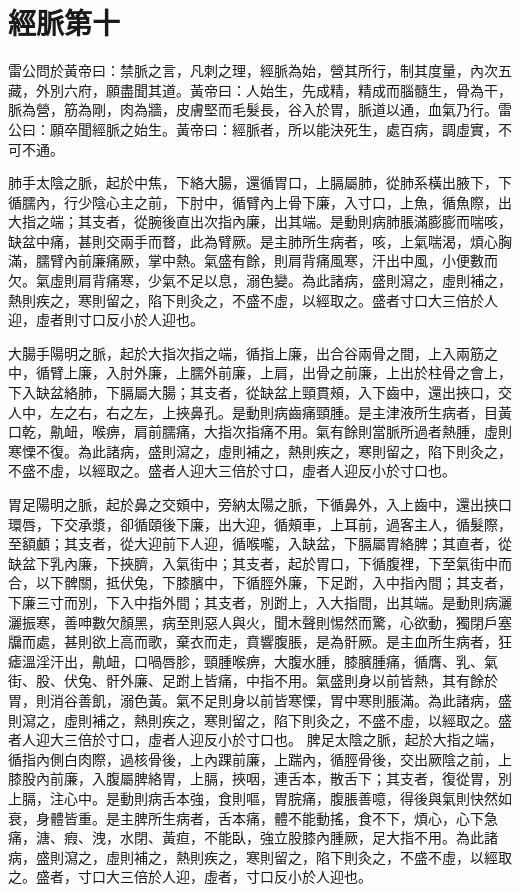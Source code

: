 \section{經脈第十}
雷公問於黃帝曰：禁脈之言，凡刺之理，經脈為始，營其所行，制其度量，內次五藏，外別六府，願盡聞其道。黃帝曰：人始生，先成精，精成而腦髓生，骨為干，脈為營，筋為剛，肉為牆，皮膚堅而毛髮長，谷入於胃，脈道以通，血氣乃行。雷公曰：願卒聞經脈之始生。黃帝曰：經脈者，所以能決死生，處百病，調虛實，不可不通。

肺手太陰之脈，起於中焦，下絡大腸，還循胃口，上膈屬肺，從肺系橫出腋下，下循臑內，行少陰心主之前，下肘中，循臂內上骨下廉，入寸口，上魚，循魚際，出大指之端；其支者，從腕後直出次指內廉，出其端。是動則病肺脹滿膨膨而喘咳，缺盆中痛，甚則交兩手而瞀，此為臂厥。是主肺所生病者，咳，上氣喘渴，煩心胸滿，臑臂內前廉痛厥，掌中熱。氣盛有餘，則肩背痛風寒，汗出中風，小便數而欠。氣虛則肩背痛寒，少氣不足以息，溺色變。為此諸病，盛則瀉之，虛則補之，熱則疾之，寒則留之，陷下則灸之，不盛不虛，以經取之。盛者寸口大三倍於人迎，虛者則寸口反小於人迎也。

大腸手陽明之脈，起於大指次指之端，循指上廉，出合谷兩骨之間，上入兩筋之中，循臂上廉，入肘外廉，上臑外前廉，上肩，出骨之前廉，上出於柱骨之會上，下入缺盆絡肺，下膈屬大腸；其支者，從缺盆上頸貫頰，入下齒中，還出挾口，交人中，左之右，右之左，上挾鼻孔。是動則病齒痛頸腫。是主津液所生病者，目黃口乾，鼽衄，喉痹，肩前臑痛，大指次指痛不用。氣有餘則當脈所過者熱腫，虛則寒慄不復。為此諸病，盛則瀉之，虛則補之，熱則疾之，寒則留之，陷下則灸之，不盛不虛，以經取之。盛者人迎大三倍於寸口，虛者人迎反小於寸口也。

胃足陽明之脈，起於鼻之交頞中，旁納太陽之脈，下循鼻外，入上齒中，還出挾口環唇，下交承漿，卻循頤後下廉，出大迎，循頰車，上耳前，過客主人，循髮際，至額顱；其支者，從大迎前下人迎，循喉嚨，入缺盆，下膈屬胃絡脾；其直者，從缺盆下乳內廉，下挾臍，入氣街中；其支者，起於胃口，下循腹裡，下至氣街中而合，以下髀關，抵伏兔，下膝臏中，下循脛外廉，下足跗，入中指內間；其支者，下廉三寸而別，下入中指外間；其支者，別跗上，入大指間，出其端。是動則病灑灑振寒，善呻數欠顏黑，病至則惡人與火，聞木聲則惕然而驚，心欲動，獨閉戶塞牖而處，甚則欲上高而歌，棄衣而走，賁響腹脹，是為骭厥。是主血所生病者，狂瘧溫淫汗出，鼽衄，口喎唇胗，頸腫喉痹，大腹水腫，膝臏腫痛，循膺、乳、氣街、股、伏兔、骭外廉、足跗上皆痛，中指不用。氣盛則身以前皆熱，其有餘於胃，則消谷善飢，溺色黃。氣不足則身以前皆寒慄，胃中寒則脹滿。為此諸病，盛則瀉之，虛則補之，熱則疾之，寒則留之，陷下則灸之，不盛不虛，以經取之。盛者人迎大三倍於寸口，虛者人迎反小於寸口也。
脾足太陰之脈，起於大指之端，循指內側白肉際，過核骨後，上內踝前廉，上踹內，循脛骨後，交出厥陰之前，上膝股內前廉，入腹屬脾絡胃，上膈，挾咽，連舌本，散舌下；其支者，復從胃，別上膈，注心中。是動則病舌本強，食則嘔，胃脘痛，腹脹善噫，得後與氣則快然如衰，身體皆重。是主脾所生病者，舌本痛，體不能動搖，食不下，煩心，心下急痛，溏、瘕、洩，水閉、黃疸，不能臥，強立股膝內腫厥，足大指不用。為此諸病，盛則瀉之，虛則補之，熱則疾之，寒則留之，陷下則灸之，不盛不虛，以經取之。盛者，寸口大三倍於人迎，虛者，寸口反小於人迎也。

